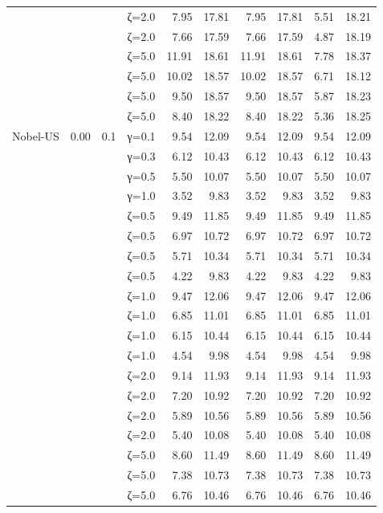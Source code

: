 \begin{table}[htbp]
\begin{tabular}{ll r l  rr  rr  rr}
  &  &  & ζ=2.0 & 7.95 & 17.81 & 7.95 & 17.81 & 5.51 & 18.21 \\
  &  &  & ζ=2.0 & 7.66 & 17.59 & 7.66 & 17.59 & 4.87 & 18.19 \\
  &  &  & ζ=5.0 & 11.91 & 18.61 & 11.91 & 18.61 & 7.78 & 18.37 \\
  &  &  & ζ=5.0 & 10.02 & 18.57 & 10.02 & 18.57 & 6.71 & 18.12 \\
  &  &  & ζ=5.0 & 9.50 & 18.57 & 9.50 & 18.57 & 5.87 & 18.23 \\
  &  &  & ζ=5.0 & 8.40 & 18.22 & 8.40 & 18.22 & 5.36 & 18.25 \\
\midrule
 Nobel-US & 0.00 & 0.1 & γ=0.1 & 9.54 & 12.09 & 9.54 & 12.09 & 9.54 & 12.09 \\
  &  &  & γ=0.3 & 6.12 & 10.43 & 6.12 & 10.43 & 6.12 & 10.43 \\
  &  &  & γ=0.5 & 5.50 & 10.07 & 5.50 & 10.07 & 5.50 & 10.07 \\
  &  &  & γ=1.0 & 3.52 & 9.83 & 3.52 & 9.83 & 3.52 & 9.83 \\
  &  &  & ζ=0.5 & 9.49 & 11.85 & 9.49 & 11.85 & 9.49 & 11.85 \\
  &  &  & ζ=0.5 & 6.97 & 10.72 & 6.97 & 10.72 & 6.97 & 10.72 \\
  &  &  & ζ=0.5 & 5.71 & 10.34 & 5.71 & 10.34 & 5.71 & 10.34 \\
  &  &  & ζ=0.5 & 4.22 & 9.83 & 4.22 & 9.83 & 4.22 & 9.83 \\
  &  &  & ζ=1.0 & 9.47 & 12.06 & 9.47 & 12.06 & 9.47 & 12.06 \\
  &  &  & ζ=1.0 & 6.85 & 11.01 & 6.85 & 11.01 & 6.85 & 11.01 \\
  &  &  & ζ=1.0 & 6.15 & 10.44 & 6.15 & 10.44 & 6.15 & 10.44 \\
  &  &  & ζ=1.0 & 4.54 & 9.98 & 4.54 & 9.98 & 4.54 & 9.98 \\
  &  &  & ζ=2.0 & 9.14 & 11.93 & 9.14 & 11.93 & 9.14 & 11.93 \\
  &  &  & ζ=2.0 & 7.20 & 10.92 & 7.20 & 10.92 & 7.20 & 10.92 \\
  &  &  & ζ=2.0 & 5.89 & 10.56 & 5.89 & 10.56 & 5.89 & 10.56 \\
  &  &  & ζ=2.0 & 5.40 & 10.08 & 5.40 & 10.08 & 5.40 & 10.08 \\
  &  &  & ζ=5.0 & 8.60 & 11.49 & 8.60 & 11.49 & 8.60 & 11.49 \\
  &  &  & ζ=5.0 & 7.38 & 10.73 & 7.38 & 10.73 & 7.38 & 10.73 \\
  &  &  & ζ=5.0 & 6.76 & 10.46 & 6.76 & 10.46 & 6.76 & 10.46 \\

\end{tabular}
\end{table}
